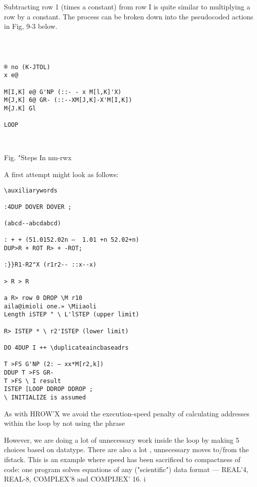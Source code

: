 {{{{{{{{{%

Subtracting row 1 (times a constant) from row I is quite similar to
multiplying a row by a constant. The process can be broken down
into the pseudocoded actions in Fig, 9-3 below.

 
\begin{verbatim}

 

® no (K-JTOL)
x e@

M[I,K] e@ G'NP (::- - x M[l,K]'X)
M{J,K] 6@ GR- (::--XM[J,K]-X'M[I,K])
M{J.K] Gl

LOOP

 

\end{verbatim} 

Fig. "Steps In nm-rwx

A first attempt might look as follows:

\begin{verbatim}
\auxiliarywords

:4DUP DOVER DOVER ;

(abcd--abcdabcd)

: + + (51.0152.02n —  1.01 +n 52.02+n)
DUP>R + ROT R> + -ROT;

:}}R1-R2"X (r1r2-- ::x--x)

> R > R

a R> row 0 DROP \M r10
aila@imioli one.» \Miiaoli
Length iSTEP " \ L'lSTEP (upper limit)

R> ISTEP * \ r2'ISTEP (lower limit)

DO 4DUP I ++ \duplicateaincbaseadrs

T >FS G'NP (2: — xx*M[r2,k])
DDUP T >FS GR-
T >FS \ I result
ISTEP [LOOP DDROP DDROP ;
\ INITIALIZE is assumed

\end{verbatim} 
As with HROW'X we avoid the execution-speed penalty of
calculating addresses within the loop by not using the phrase




     
  
 
 
 

However, we are doing a lot of unnecessary work inside the loop
by making 5 choices based on datatype. There are also a lot ,
unnecessary moves to/from the ifstack. This is an example where
speed has been sacrificed to compactness of code: one program
solves equations of any ("scientific") data format — REAL'4,
REAL-8, COMPLEX'8 and COMPIJEX' 16. i

}}}}}}}}}
